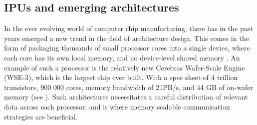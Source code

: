 \subsection{IPUs and emerging architectures}
In the ever evolving world of computer chip manufacturing, there has in the past years emerged a new trend in the field of architecture design. This comes in the form of packaging thousands of small processor cores into a single device, where each core has its own local memory, and no device-level shared memory \cite{10.3389/fphy.2023.979699}. An example of such a processor is the relatively new Cerebras Wafer-Scale Engine (WSE-3), which is the largest chip ever built. With a spec sheet of 4 trillion transistors, 900 000 cores, memory bandwidth of 21PB/s, and 44 GB of on-wafer memory (see \cite{cerebras2024wse3}). Such architectures necessitates a careful distribution of relevant data across each processor, and is where memory scalable communication strategies are beneficial.
\medskip
